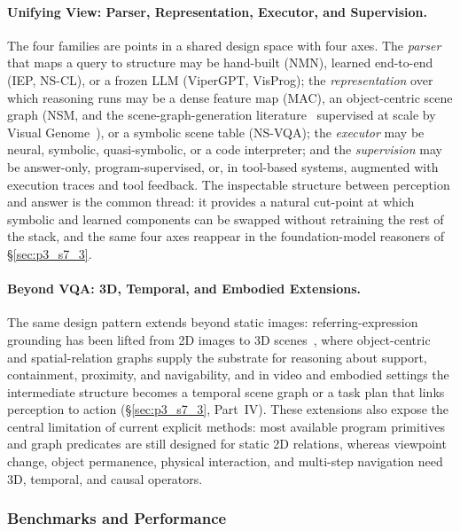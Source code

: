 \paragraph{Unifying View: Parser, Representation, Executor, and Supervision.}
The four families are points in a shared design space with four axes.
The \emph{parser} that maps a query to structure may be hand-built (NMN), learned end-to-end (IEP, NS-CL), or a frozen LLM (ViperGPT, VisProg); the \emph{representation} over which reasoning runs may be a dense feature map (MAC), an object-centric scene graph (NSM, and the scene-graph-generation literature~\cite{xu2017scene} supervised at scale by Visual Genome~\cite{krishna2017visual}), or a symbolic scene table (NS-VQA); the \emph{executor} may be neural, symbolic, quasi-symbolic, or a code interpreter; and the \emph{supervision} may be answer-only, program-supervised, or, in tool-based systems, augmented with execution traces and tool feedback.
The inspectable structure between perception and answer is the common thread: it provides a natural cut-point at which symbolic and learned components can be swapped without retraining the rest of the stack, and the same four axes reappear in the foundation-model reasoners of §\ref{sec:p3_s7_3}.

\paragraph{Beyond VQA: 3D, Temporal, and Embodied Extensions.}
The same design pattern extends beyond static images: referring-expression grounding has been lifted from 2D images to 3D scenes~\cite{achlioptas2020referit3d}, where object-centric and spatial-relation graphs supply the substrate for reasoning about support, containment, proximity, and navigability, and in video and embodied settings the intermediate structure becomes a temporal scene graph or a task plan that links perception to action (§\ref{sec:p3_s7_3}, Part~IV).
These extensions also expose the central limitation of current explicit methods: most available program primitives and graph predicates are still designed for static 2D relations, whereas viewpoint change, object permanence, physical interaction, and multi-step navigation need 3D, temporal, and causal operators.


\subsubsection{Benchmarks and Performance}

